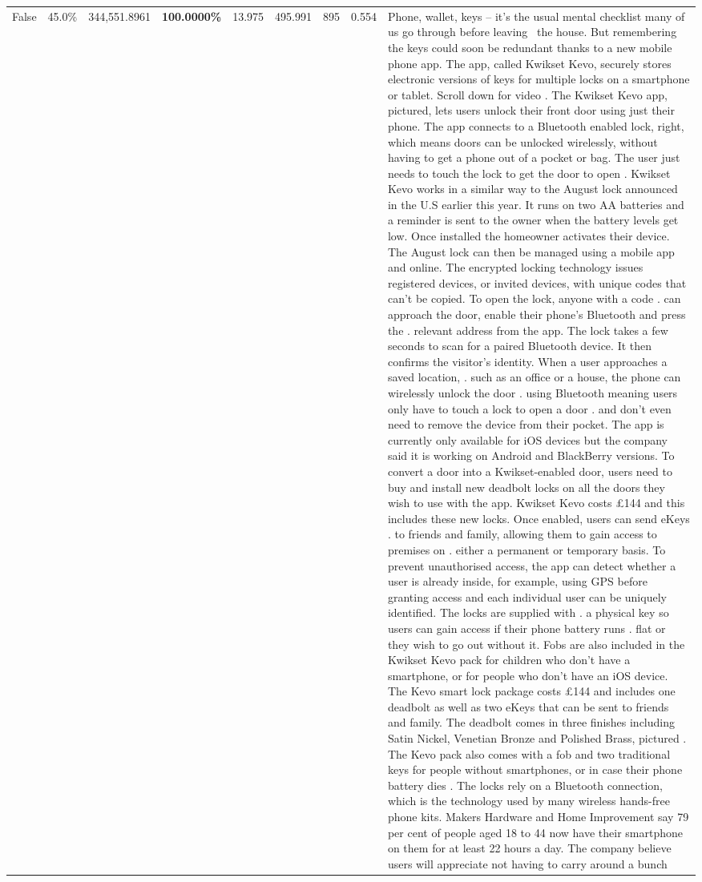 \begin{table}[H]
\begin{tabular}{lllrlllll}
False & 45.0\% & 344,551.8961 & \bfseries \color{red} 100.0000\% & 13.975 & 495.991 & 895 & 0.554 & Phone, wallet, keys – it’s the usual mental checklist many of us go through before leaving  the house. But remembering the keys could soon be redundant thanks to a new mobile phone app. The app, called Kwikset Kevo, securely stores electronic versions of keys for multiple locks on a smartphone or tablet. Scroll down for video . The Kwikset Kevo app, pictured, lets users unlock their front door using just their phone. The app connects to a Bluetooth enabled lock, right, which means doors can be unlocked wirelessly, without having to get a phone out of a pocket or bag. The user just needs to touch the lock to get the door to open . Kwikset Kevo works in a similar way to the August lock announced in the U.S earlier this year. It runs on two AA batteries and a reminder is sent to the owner when the battery levels get low. Once installed the homeowner activates their device. The August lock can then be managed using a mobile app and online. The encrypted locking technology issues registered devices, or invited devices, with unique codes that can't be copied. To open the lock, anyone with a code . can approach the door, enable their phone's Bluetooth and press the . relevant address from the app. The lock takes a few seconds to scan for a paired Bluetooth device. It then confirms the visitor's identity. When a user approaches a saved location, . such as an office or a house, the phone can wirelessly unlock the door . using Bluetooth meaning users only have to touch a lock to open a door . and don't even need to remove the device from their pocket. The app is currently only available for iOS devices but the company said it is working on Android and BlackBerry versions. To convert a door into a Kwikset-enabled door, users need to buy and install new deadbolt locks on all the doors they wish to use with the app. Kwikset Kevo costs £144 and this includes these new locks. Once enabled, users can send eKeys . to friends and family, allowing them to gain access to premises on . either a permanent or temporary basis. To prevent unauthorised access, the app can detect whether a user is already inside, for example, using GPS before granting access and each individual user can be uniquely identified. The locks are supplied with . a physical key so users can gain access if their phone battery runs . flat or they wish to go out without it. Fobs are also included in the Kwikset Kevo pack for children who don't have a smartphone, or for people who don't have an iOS device. The Kevo smart lock package costs £144 and includes one deadbolt as well as two eKeys that can be sent to friends and family. The deadbolt comes in three finishes including Satin Nickel, Venetian Bronze and Polished Brass, pictured . The Kevo pack also comes with a fob and two traditional keys for people without smartphones, or in case their phone battery dies . The locks rely on a Bluetooth connection, which is the technology used by many wireless hands-free phone kits. Makers Hardware and Home Improvement say 79 per cent of people aged 18 to 44 now have their smartphone on them for at least 22 hours a day. The company believe users will appreciate not having to carry around a bunch 
\end{tabular}
\end{table}
